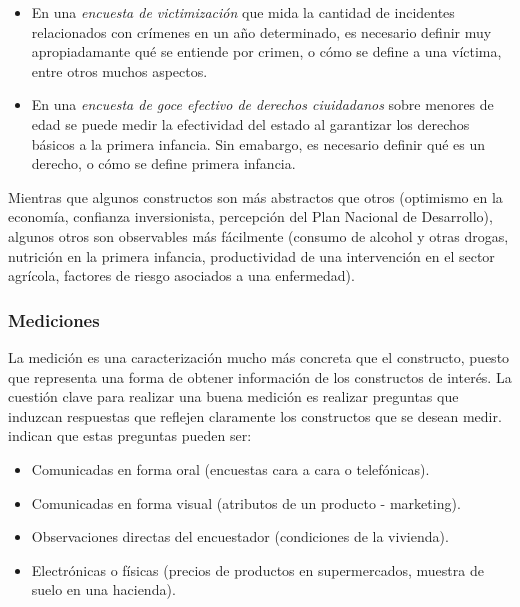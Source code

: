 \documentclass[
  10pt,
  spanish,
]{book}
\providecommand{\tightlist}{%
  \setlength{\itemsep}{0pt}\setlength{\parskip}{0pt}}
\begin{document}
\begin{itemize}
\tightlist
\item
  En una \emph{encuesta de victimización} que mida la cantidad de incidentes relacionados con crímenes en un año determinado, es necesario definir muy apropiadamante qué se entiende por crimen, o cómo se define a una víctima, entre otros muchos aspectos.
\item
  En una \emph{encuesta de goce efectivo de derechos ciuidadanos} sobre menores de edad se puede medir la efectividad del estado al garantizar los derechos básicos a la primera infancia. Sin emabargo, es necesario definir qué es un derecho, o cómo se define primera infancia.
\end{itemize}

Mientras que algunos constructos son más abstractos que otros (optimismo en la economía, confianza inversionista, percepción del Plan Nacional de Desarrollo), algunos otros son observables más fácilmente (consumo de alcohol y otras drogas, nutrición en la primera infancia, productividad de una intervención en el sector agrícola, factores de riesgo asociados a una enfermedad).

\hypertarget{mediciones}{%
\subsubsection*{Mediciones}\label{mediciones}}

La medición es una caracterización mucho más concreta que el constructo, puesto que representa una forma de obtener información de los constructos de interés. La cuestión clave para realizar una buena medición es realizar preguntas que induzcan respuestas que reflejen claramente los constructos que se desean medir. \citet{Groves_Fowler_Couper_Lepkowski_Singer_Tourangeau_2009} indican que estas preguntas pueden ser:

\begin{itemize}
\tightlist
\item
  Comunicadas en forma oral (encuestas cara a cara o telefónicas).
\item
  Comunicadas en forma visual (atributos de un producto - marketing).
\item
  Observaciones directas del encuestador (condiciones de la vivienda).
\item
  Electrónicas o físicas (precios de productos en supermercados, muestra de suelo en una hacienda).
\end{itemize}
\end{document}
